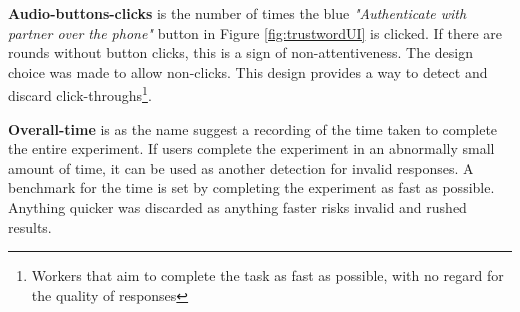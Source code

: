 \textbf{Audio-buttons-clicks} is the number of times the blue \textit{"Authenticate with partner over the phone"} button in Figure \ref{fig:trustwordUI} is clicked. If there are rounds without button clicks, this is a sign of non-attentiveness. The design choice was made to allow non-clicks. This design provides a way to detect and discard click-throughs\footnote{Workers that aim to complete the task as fast as possible, with no regard for the quality of responses}. 

\textbf{Overall-time} is as the name suggest a recording of the time taken to complete the entire experiment. If users complete the experiment in an abnormally small amount of time, it can be used as another detection for invalid responses. A benchmark for the time is set by completing the experiment as fast as possible. Anything quicker was discarded as anything faster risks invalid and rushed results.